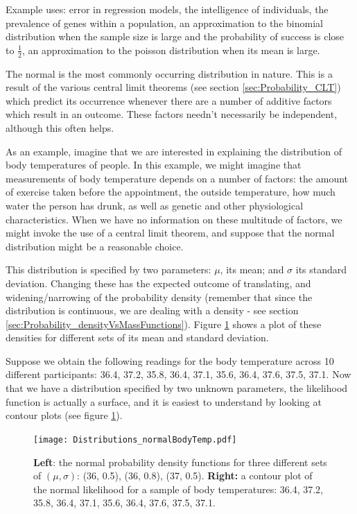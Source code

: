 \documentclass[11pt,fullpage]{book}
\begin{document}
Example uses: error in regression models, the intelligence of individuals, the prevalence of genes within a population, an approximation to the binomial distribution when the sample size is large and the probability of success is close to $\frac{1}{2}$, an approximation to the poisson distribution when its mean is large.

The normal is the most commonly occurring distribution in nature. This is a result of the various central limit theorems (see section \ref{sec:Probability_CLT}) which predict its occurrence whenever there are a number of additive factors which result in an outcome. These factors needn't necessarily be independent, although this often helps.

As an example, imagine that we are interested in explaining the distribution of body temperatures of people. In this example, we might imagine that measurements of body temperature depends on a number of factors: the amount of exercise taken before the appointment, the outside temperature, how much water the person has drunk, as well as genetic and other physiological characteristics. When we have no information on these multitude of factors, we might invoke the use of a central limit theorem, and suppose that the normal distribution might be a reasonable choice.

This distribution is specified by two parameters: $\mu$, its mean; and $\sigma$ its standard deviation. Changing these has the expected outcome of translating, and widening/narrowing of the probability density (remember that since the distribution is continuous, we are dealing with a density - see section \ref{sec:Probability_densityVsMassFunctions}). Figure \ref{fig:Distributions_normalBodyTemp} shows a plot of these densities for different sets of its mean and standard deviation.

Suppose we obtain the following readings for the body temperature across 10 different participants: {36.4, 37.2, 35.8, 36.4, 37.1, 35.6, 36.4, 37.6, 37.5, 37.1}. Now that we have a distribution specified by two unknown parameters, the likelihood function is actually a surface, and it is easiest to understand by looking at contour plots (see figure \ref{fig:Distributions_normalBodyTemp}). 

\begin{figure}
\centering
\scalebox{0.5} 
{\texttt{[image: Distributions\_normalBodyTemp.pdf]}}
\caption{\textbf{Left}: the normal probability density functions for three different sets of $(\mu,\sigma)$: (36, 0.5), (36, 0.8), (37, 0.5). \textbf{Right:} a contour plot of the normal likelihood for a sample of body temperatures: {36.4, 37.2, 35.8, 36.4, 37.1, 35.6, 36.4, 37.6, 37.5, 37.1}.}\label{fig:Distributions_normalBodyTemp}
\end{figure}
\end{document}
